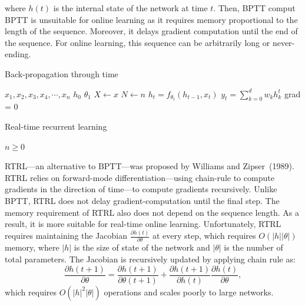 \documentclass[twoside,11pt]{article}
\begin{document}
where $h(t)$ is the internal state of the network at time $t$. Then, BPTT comput
BPTT is unsuitable for online learning as it requires memory proportional to the length of the sequence. Moreover, it delays gradient computation until the end of the sequence. For online learning, this sequence can be arbitrarily long or never-ending.
\begin{algorithm}
\caption{Back-propagation through time}\label{alg:cap}
\begin{algorithmic}
	\Require $x_1, x_2, x_3, x_4, \cdots, x_n$
	\Require $h_0$
	\Require $\theta_1$
	\State $X \gets x$
	\State $N \gets n$
		\State $h_t = f_{\theta_t}(h_{t-1}, x_t)$
	\EndFor
	\State $y_t = \sum_{k=0}^{d} w_k h_k^t$
	\State grad = 0
	\State 
	\EndFor
	 
\end{algorithmic}
\end{algorithm}


\begin{algorithm}
	\caption{Real-time recurrent learning}\label{alg:cap}
	\begin{algorithmic}
		\Require $n \geq 0$
	\end{algorithmic}
\end{algorithm}





RTRL---an alternative to BPTT---was proposed by Williams and Zipser~(1989). RTRL relies on forward-mode differentiation---using chain-rule to compute gradients in the direction of time---to compute gradients recursively. Unlike BPTT, RTRL does not delay gradient-computation until the final step. The memory requirement of RTRL also does not depend on the sequence length. As a result, it is more suitable for real-time online learning. Unfortunately, RTRL requires maintaining the Jacobian $\frac{\partial h(t)}{\partial \theta}$ at every step, which requires $O(|h||\theta|)$ memory, where $|h|$ is the size of state of the network and $|\theta|$ is the number of total parameters. The Jacobian is recursively updated by applying chain rule as:  
$$\frac{\partial h(t+1)}{\partial \theta} =\frac{\partial h(t+1)}{\partial \theta(t+1)} +  \frac{\partial h(t+1)}{\partial h(t)}\frac{\partial h(t)}{\partial \theta}, $$ 
which requires  $O(|h|^2|\theta|)$ operations and scales poorly to large networks.
\end{document}
